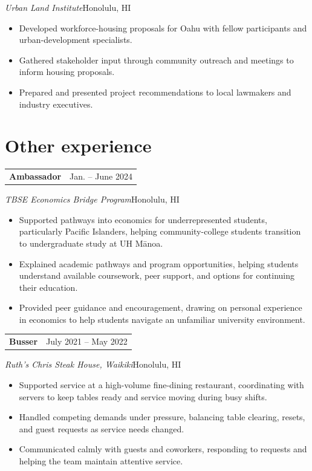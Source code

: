 \documentclass[10pt,letterpaper]{article}
\begin{document}
\emph{Urban Land Institute}\hfill {\small\color{muted}Honolulu, HI}\par
\begin{itemize}
\item Developed workforce-housing proposals for Oahu with fellow participants and urban-development specialists.
\item Gathered stakeholder input through community outreach and meetings to inform housing proposals.
\item Prepared and presented project recommendations to local lawmakers and industry executives.
\end{itemize}
\vspace{4pt}

\section*{Other experience}
\begin{tabularx}{\linewidth}{@{}X r@{}}\textbf{Ambassador} & {\small Jan. -- June 2024}\\\end{tabularx}
\emph{TBSE Economics Bridge Program}\hfill {\small\color{muted}Honolulu, HI}\par
\begin{itemize}
\item Supported pathways into economics for underrepresented students, particularly Pacific Islanders, helping community-college students transition to undergraduate study at UH M\={a}noa.
\item Explained academic pathways and program opportunities, helping students understand available coursework, peer support, and options for continuing their education.
\item Provided peer guidance and encouragement, drawing on personal experience in economics to help students navigate an unfamiliar university environment.
\end{itemize}
\vspace{4pt}
\begin{tabularx}{\linewidth}{@{}X r@{}}\textbf{Busser} & {\small July 2021 -- May 2022}\\\end{tabularx}
\emph{Ruth's Chris Steak House, Waikiki}\hfill {\small\color{muted}Honolulu, HI}\par
\begin{itemize}
\item Supported service at a high-volume fine-dining restaurant, coordinating with servers to keep tables ready and service moving during busy shifts.
\item Handled competing demands under pressure, balancing table clearing, resets, and guest requests as service needs changed.
\item Communicated calmly with guests and coworkers, responding to requests and helping the team maintain attentive service.
\end{itemize}
\vspace{4pt}
\end{document}

